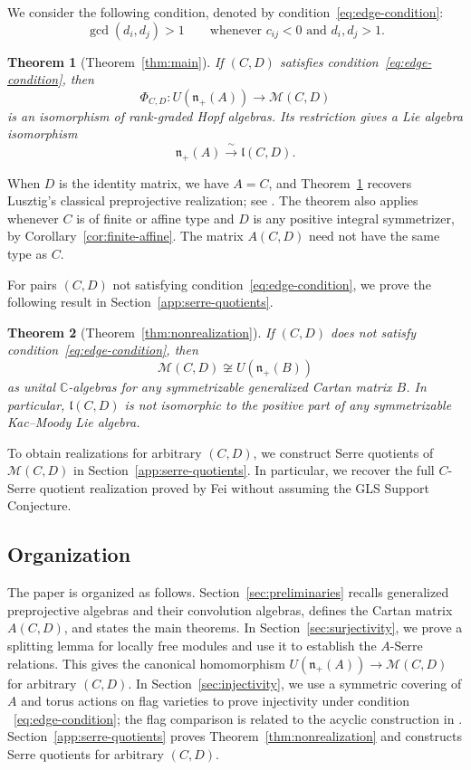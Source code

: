 \documentclass[12pt,reqno]{amsart}
\numberwithin{equation}{section}
\theoremstyle{definition}
\theoremstyle{remark}
\newcommand{\C}{\mathbb C}
\newcommand{\M}{\mathcal M}
\newcommand{\nplus}{\mathfrak n_+}
\theoremstyle{plain}
\newtheorem{introtheorem}{Theorem}
\theoremstyle{plain}
\begin{document}
We consider the following condition, denoted by condition~\eqref{eq:edge-condition}:
\[
    \gcd(d_i,d_j)>1
    \qquad\text{whenever }c_{ij}<0
    \text{ and }d_i,d_j>1.
\]

\begin{introtheorem}[Theorem~\ref{thm:main}]
\label{thm:introduction-main}
If $(C,D)$ satisfies condition~\eqref{eq:edge-condition}, then  
$$\Phi_{C,D}:
    U(\nplus (A))
    \rightarrow
    \M(C,D)$$ 
    is an isomorphism of rank-graded Hopf algebras. Its restriction gives a Lie algebra isomorphism
\[
    \nplus(A)
    \xrightarrow{\;\sim\;}
    \mathfrak l(C,D).
\]
\end{introtheorem}

When $D$ is the identity matrix, we have $A=C$, and Theorem~\ref{thm:introduction-main} recovers Lusztig's classical preprojective realization; see \cite[Section~1.2]{GLS18}. The theorem also applies whenever $C$ is of finite or affine type and $D$ is any positive integral symmetrizer, by Corollary~\ref{cor:finite-affine}. The matrix $A(C,D)$ need not have the same type as $C$.

For pairs $(C,D)$ not satisfying condition~\eqref{eq:edge-condition}, we prove the following result in Section~\ref{app:serre-quotients}.

\begin{introtheorem}[Theorem~\ref{thm:nonrealization}]
\label{thm:introduction-nonrealization}
If $(C,D)$ does not satisfy condition~\eqref{eq:edge-condition}, then
\[
    \mathcal M(C,D)\not\cong U(\mathfrak n_+(B))
\]
as unital $\C$-algebras for any symmetrizable generalized Cartan matrix $B$.
In particular, $\mathfrak l(C,D)$ is not isomorphic to the positive part of any symmetrizable Kac--Moody Lie algebra.
\end{introtheorem}

To obtain realizations for arbitrary $(C,D)$, we construct Serre quotients of $\M(C,D)$ in Section~\ref{app:serre-quotients}. In particular, we recover the full $C$-Serre quotient realization proved by Fei \cite[Theorem~10.1]{Fei26} without assuming the GLS Support Conjecture.

\subsection{Organization}
The paper is organized as follows. 
Section~\ref{sec:preliminaries} recalls generalized preprojective algebras and their convolution algebras, defines the Cartan matrix $A(C,D)$, and states the main theorems.
In Section~\ref{sec:surjectivity}, we prove a splitting lemma for locally free modules and use it to establish the $A$-Serre relations. This gives the canonical homomorphism $U(\mathfrak n_+(A))\to\mathcal M(C,D)$ for arbitrary $(C,D)$.
In Section~\ref{sec:injectivity}, we use a symmetric covering of $A$ and torus actions on flag varieties to prove injectivity under condition ~\eqref{eq:edge-condition}; the flag comparison is related to the acyclic construction in \cite[Appendix~A]{Fei26}.
Section~\ref{app:serre-quotients} proves Theorem~\ref{thm:nonrealization} and constructs Serre quotients for arbitrary $(C,D)$.
\end{document}
